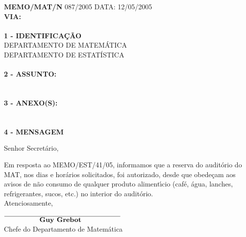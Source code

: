 \addtolength{\oddsidemargin}{-2pc}
\addtolength{\evensidemargin}{2pc}
\setlength{\topmargin}{.5cm}
\setlength{\textwidth}{16cm} 
\setlength{\textheight}{25cm}
\pagestyle{empty}

\vspace*{1.3cm}
\timbrado
\parindent=2cm 
\setlength{\baselineskip}{5mm}
\noindent 
\begin{minipage}{16cm}
\vspace*{-1.8cm}
\parindent=2cm
\setlength{\baselineskip}{5mm}
\vspace*{1.5cm}
\noindent
\small
{\bf  MEMO/MAT/N\primo} 087/2005 \hfill {DATA:} {12/05/2005}
\vum \\
{\bf VIA:} {}  
\\
\mbox{} \hrulefill\
\\
{\bf 1 - IDENTIFICA\c{C}\~AO} 
\\
\phantom{xxx}{\bf Proced\^encia:} {DEPARTAMENTO DE MATEM\'ATICA}
\\
 {DEPARTAMENTO DE ESTAT\'ISTICA}
\\
\mbox{} \hrulefill\
\\
{\bf 2 - ASSUNTO:} \\
\phantom{xxx}{Reserva do audit\'orio do MAT pelo EST}
\\
\mbox{} \hrulefill\
\\
{\bf 3 - ANEXO(S):} 
\\
\phantom{xxx} {}
\\
\mbox{} \hrulefill\
\\
{ \bf 4 - MENSAGEM} 
\end{minipage}
\setlength{\baselineskip}{6mm}
\vspace*{2.2cm} 

Senhor Secret\'ario,

\bigskip

\bigskip

Em resposta ao MEMO/EST/41/05, informamos que a reserva do audit\'orio do MAT, nos dias e hor\'arios solicitados, foi autorizado, desde que obede\c{c}am aos avisos de n\~ao consumo de qualquer produto aliment\'{\i}cio (caf\'e, \'agua, lanches, refrigerantes, sucos, etc.) no interior do audit\'orio.
\vspace*{8mm} \\
\hspace*{8.5cm} Atenciosamente,
\vspace*{2.5cm} \\
\hspace*{5cm} 
\begin{minipage}{10cm}
\setlength{\baselineskip}{4mm}
\begin{center} 
$\overline{\phantom{xxxxxxxxx}\mbox{\bf  
Guy Grebot} \phantom{xxxxxxxxxx}}$ 
\\
Chefe do Departamento de Matem\'atica
\end{center}
\end{minipage}

